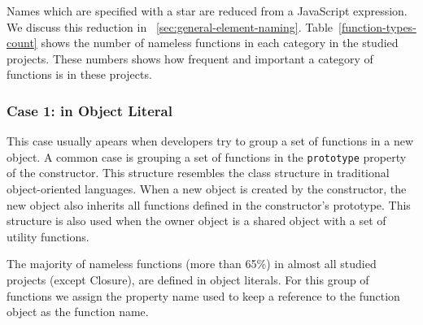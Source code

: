 \documentclass{acm_proc_article-sp}
\begin{document}
Names which are specified with a star are reduced from a JavaScript expression. We discuss this reduction in ~\ref{sec:general-element-naming}. Table~\ref{function-types-count} shows the number of nameless functions in each category in the studied projects. These numbers shows how frequent and important a category of functions is in these projects. 
  
\subsubsection{Case 1: in Object Literal}
 This case usually apears when developers try to group a set of functions in a new object. A common case is grouping a set of functions in the {\small\texttt{prototype}} property of the constructor. This structure resembles the class structure in traditional object-oriented languages. When a new object is created by the constructor, the new object also inherits all functions defined in the constructor's prototype. This structure is also used  when the owner object is a shared object with a set of utility functions.
 
 The majority of nameless functions (more than 65\%) in almost all studied projects (except Closure), are defined in object literals. For this group of functions we assign the property name used to keep a reference to the function object as the function name.     
 
\end{document}
